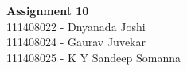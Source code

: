 \documentclass[main.tex]{subfiles}
\begin{document}
\begin{titlepage}

\begin{center}
  \LARGE{\bf{Assignment 10\\}}
  \horrule{0.4pt}
  111408022 - Dnyanada Joshi \\
  111408024 - Gaurav Juvekar \\
  111408025 - K Y Sandeep Somanna \\
\end{center}
\horrule{0.4pt}
\end{titlepage}
\end{document}
